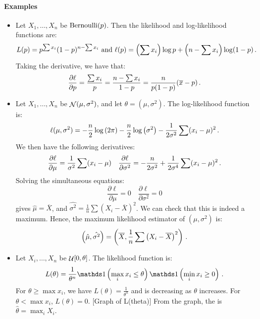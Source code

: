 \paragraph{Examples}
\begin{itemize}
\item Let $X_1, \dotsc, X_n$ be \iid $\operatorname{Bernoulli}(p)$. Then the likelihood and log-likelihood functions are:
\[
L(p) = p^{\sum x_i}(1-p)^{n - \sum x_i} \text{ and }
\ell(p) = \left(\sum x_i\right)\log p + \left(n - \sum x_i\right)\log (1 - p) \, {.}
\]
Taking the derivative, we have that:
\[
\frac{\partial \ell}{\partial p} = \frac{\sum x_i}{p} = \frac{n - \sum x_i}{1-p} = \frac{n}{p(1-p)}(\overline{x} - p) \, {.}
\]

\item Let $X_1, \dotsc, X_n$ be \iid $\mathop{\mathcal{N}}(\mu, \sigma^2)$, and let $\theta = (\mu, \sigma^2)$. The log-likelihood function is:
\[
\ell (\mu, \sigma^2) = -\frac{n}{2}\log \left(2\pi\right) - \frac{n}{2}\log \left(\sigma^2\right) - \frac{1}{2\sigma^2}\sum (x_i - \mu)^2 \, {.}
\]
We then have the following derivatives:
\[
\frac{\partial \ell}{\partial \mu} = \frac{1}{\sigma^2}\sum(x_i - \mu) \quad \frac{\partial \ell}{\partial \sigma^2} = -\frac{n}{2\sigma^2} + \frac{1}{2\sigma^4}\sum (x_i - \mu)^2 \, {.}
\]
Solving the simultaneous equations:
\[
\frac{\partial \ell}{\partial \mu} = 0 \quad \frac{\partial \ell}{\partial \sigma^2} = 0
\]
gives $\hat{\mu} = \overline{X}$, and $\hat{\sigma^2} = \frac{1}{n}\sum\left(X_i - \overline{X}\right)^2$. We can check that this is indeed a maximum.
Hence, the maximum likelihood estimator of $(\mu, \sigma^2)$ is:
\[
\left(\hat{\mu}, \hat{\sigma^2}\right) = \left(\overline{X}, \frac{1}{n}\sum\left(X_i - \overline{X}\right)^2\right) \, {.}
\]

\item Let $X_i, \dotsc, X_n$ be \iid $\mathop{\mathcal{U}}[0, \theta]$. The likelihood function is:
\[
L(\theta) = \frac{1}{\theta^n}\indicator{\max_i x_i \leq \theta}\indicator{\min_i x_i \geq 0} \mpunct{.}
\]
For $\theta \geq \max x_i$, we have $L(\theta) = \frac{1}{\theta^n}$ and is decreasing as $\theta$ increases. For $\theta < \max x_i$, $L(\theta) = 0$.
[Graph of L(theta)]
From the graph, the \mle is $\hat{\theta} = \max_i X_i$.


\end{itemize}
